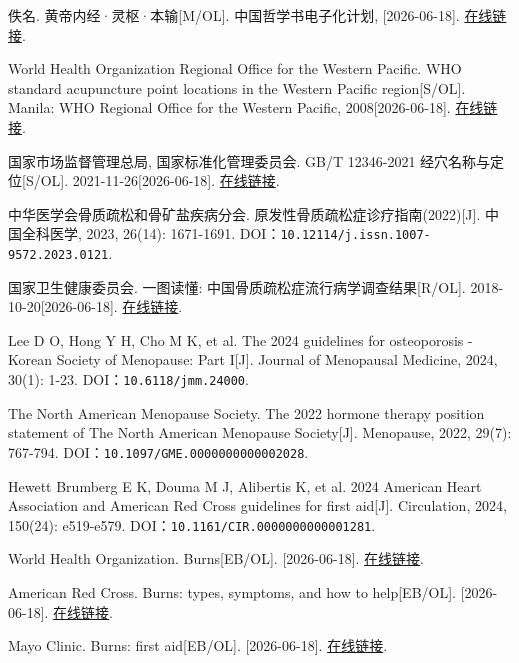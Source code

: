 \begin{enumerate}[label={[Q\arabic*]},leftmargin=*]
  \item 佚名. 黄帝内经·灵枢·本输[M/OL]. 中国哲学书电子化计划, [2026-06-18]. \href{https://ctext.org/huangdi-neijing/ben-shu/zhs}{在线链接}.
  \item World Health Organization Regional Office for the Western Pacific. WHO standard acupuncture point locations in the Western Pacific region[S/OL]. Manila: WHO Regional Office for the Western Pacific, 2008[2026-06-18]. \href{https://iris.who.int/items/f188654a-d8a7-4519-9979-8e2de713c060}{在线链接}.
  \item 国家市场监督管理总局, 国家标准化管理委员会. GB/T 12346-2021 经穴名称与定位[S/OL]. 2021-11-26[2026-06-18]. \href{https://openstd.samr.gov.cn/bzgk/std/newGbInfo?hcno=397548AE7248D3D87DD15E0AB8107185}{在线链接}.
  \item 中华医学会骨质疏松和骨矿盐疾病分会. 原发性骨质疏松症诊疗指南(2022)[J]. 中国全科医学, 2023, 26(14): 1671-1691. DOI：\nolinkurl{10.12114/j.issn.1007-9572.2023.0121}.
  \item 国家卫生健康委员会. 一图读懂: 中国骨质疏松症流行病学调查结果[R/OL]. 2018-10-20[2026-06-18]. \href{https://www.nhc.gov.cn/wjw/zcjd/201810/1aee4c12bec7415cbebfe7eacbc09552.shtml}{在线链接}.
  \item Lee D O, Hong Y H, Cho M K, et al. The 2024 guidelines for osteoporosis - Korean Society of Menopause: Part I[J]. Journal of Menopausal Medicine, 2024, 30(1): 1-23. DOI：\nolinkurl{10.6118/jmm.24000}.
  \item The North American Menopause Society. The 2022 hormone therapy position statement of The North American Menopause Society[J]. Menopause, 2022, 29(7): 767-794. DOI：\nolinkurl{10.1097/GME.0000000000002028}.
  \item Hewett Brumberg E K, Douma M J, Alibertis K, et al. 2024 American Heart Association and American Red Cross guidelines for first aid[J]. Circulation, 2024, 150(24): e519-e579. DOI：\nolinkurl{10.1161/CIR.0000000000001281}.
  \item World Health Organization. Burns[EB/OL]. [2026-06-18]. \href{https://www.who.int/news-room/fact-sheets/detail/burns}{在线链接}.
  \item American Red Cross. Burns: types, symptoms, and how to help[EB/OL]. [2026-06-18]. \href{https://www.redcross.org/take-a-class/resources/learn-first-aid/burns}{在线链接}.
  \item Mayo Clinic. Burns: first aid[EB/OL]. [2026-06-18]. \href{https://www.mayoclinic.org/first-aid/first-aid-burns/basics/art-20056649}{在线链接}.

\end{enumerate}
